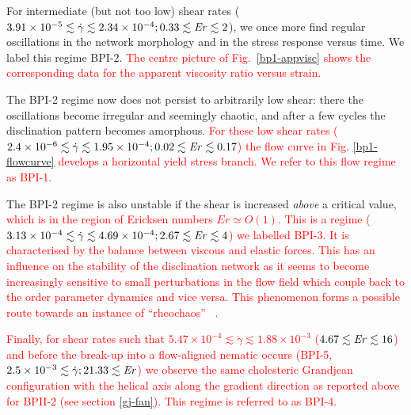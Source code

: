 \documentclass[8.5pt,twoside,twocolumn]{article}
\newcommand{\e}[1]{\times10^{#1}}
\newcommand{\gd}{\dot{\gamma}}
\newcommand{\rev}[1]{{\textcolor{red}{#1}}}
\begin{document}
For intermediate (but not too low) shear rates
($3.91\e{-5}\lesssim\gd\lesssim 2.34\e{-4}; 0.33\lesssim {\it Er} \lesssim 2$), we once more 
find regular oscillations in the network morphology and in the stress
response versus time. We label this regime BPI-2. 
\rev{
The centre picture of Fig.~\ref{bp1-appvisc} shows the corresponding data for the
apparent viscosity ratio versus strain.
}

The BPI-2 regime now does not persist to arbitrarily low shear: there the
oscillations become irregular and seemingly chaotic, and after a few
cycles the disclination pattern becomes amorphous.
\rev{
For these low shear rates 
($2.4\e{-6}\lesssim\gd\lesssim 1.95\e{-4}; 0.02\lesssim {\it Er} \lesssim 0.17$) 
the flow curve in Fig. \ref{bp1-flowcurve}
develops a horizontal yield stress branch. 
We refer to this flow regime as BPI-1.
}

The BPI-2 regime is also unstable if the shear is increased {\em above} 
a critical value, 
\rev{
which is in the region of Ericksen numbers $Er \simeq O(1)$.
This is a regime 
($3.13\e{-4}\lesssim\gd\lesssim 4.69\e{-4}; 2.67\lesssim {\it Er} \lesssim 4$) 
we labelled BPI-3. It is characterised by the balance between viscous and elastic forces.
This has an influence on the stability of the disclination network as it 
seems to become increasingly sensitive to small perturbations in the flow field
which couple back to the order parameter dynamics and vice versa. This phenomenon forms 
a possible route towards an instance of ``rheochaos'' ~\cite{rheochaos,Cates:2002}.
}

\rev{
Finally, for shear rates such that
$5.47\e{-4}\lesssim\gd\lesssim1.88\e{-3}$ ($4.67\lesssim {\it Er} \lesssim 16$) 
and before the break-up into a flow-aligned nematic occurs 
(BPI-5, $2.5\e{-3}\lesssim\gd; 21.33\lesssim {\it Er}$) 
we observe the same cholesteric Grandjean configuration with the 
helical axis along the gradient direction as 
reported above for BPII-2 (see
section \ref{gj-fan}). This regime is referred to as BPI-4.
}
 
\end{document}
